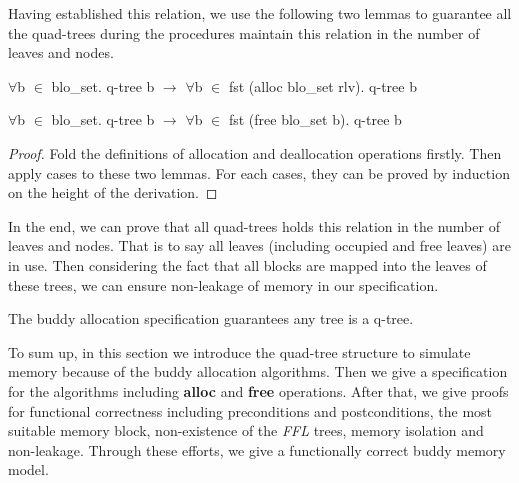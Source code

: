 Having established this relation, we use the following two lemmas to guarantee all the quad-trees during the procedures maintain this relation in the number of leaves and nodes.

\begin{lemma}
$\forall$b $\in$ blo\_set. q-tree b $\longrightarrow$ $\forall$b $\in$ fst (alloc blo\_set rlv). q-tree b
\end{lemma}

\begin{lemma}
$\forall$b $\in$ blo\_set. q-tree b $\longrightarrow$ $\forall$b $\in$ fst (free blo\_set b). q-tree b
\end{lemma}

\begin{proof}
Fold the definitions of allocation and deallocation operations firstly. Then apply cases to these two lemmas. For each cases, they can be proved by induction on the height of the derivation.
\end{proof}

In the end, we can prove that all quad-trees holds this relation in the number of leaves and nodes. That is to say all leaves (including occupied and free leaves) are in use. Then considering the fact that all blocks are mapped into the leaves of these trees, we can ensure non-leakage of memory in our specification.

\begin{theorem}
The buddy allocation specification guarantees any tree is a q-tree.
\end{theorem}

To sum up, in this section we introduce the quad-tree structure to simulate memory because of the buddy allocation algorithms. Then we give a specification for the algorithms including \textbf{alloc} and \textbf{free} operations. After that, we give proofs for functional correctness including preconditions and postconditions, the most suitable memory block, non-existence of the \emph{FFL} trees, memory isolation and non-leakage. Through these efforts, we give a functionally correct buddy memory model.


